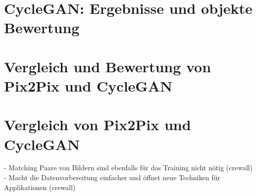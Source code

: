 \section{CycleGAN: Ergebnisse und objekte Bewertung}
\section{Vergleich und Bewertung von Pix2Pix und CycleGAN}
\section{Vergleich von Pix2Pix und CycleGAN}
- Matching Paare von Bildern sind ebenfalls für das Training nicht nötig (crewall)
- Macht die Datenvorbereitung einfacher und öffnet neue Techniken für Applikationen (crewall)